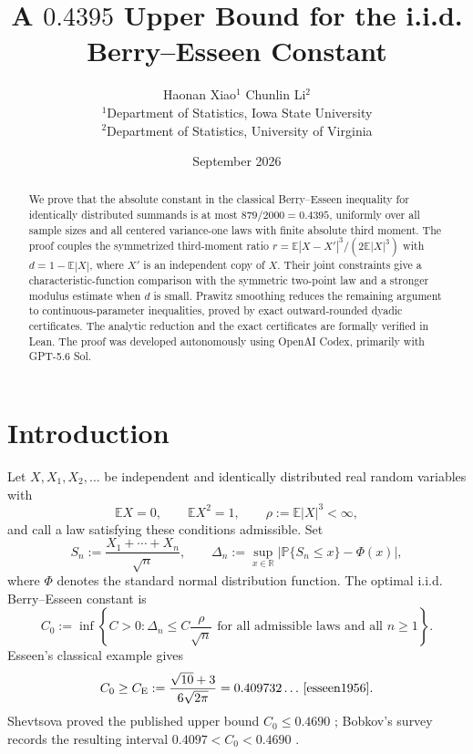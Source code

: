 \documentclass[11pt]{article}
\title{A \(0.4395\) Upper Bound for the i.i.d. Berry--Esseen Constant}
\author{%
  Haonan Xiao\({}^{1}\) \qquad Chunlin Li\({}^{2}\)\\[3pt]
  {\small \({}^{1}\)Department of Statistics, Iowa State University}\\[-1pt]
  {\small \({}^{2}\)Department of Statistics, University of Virginia}
}
\date{September 2026}
\newcommand{\E}{\mathbb E}
\newcommand{\Pp}{\mathbb P}
\newcommand{\R}{\mathbb R}
\newcommand{\abs}[1]{\lvert#1\rvert}
\begin{document}
\maketitle

\begingroup
\renewcommand{\thefootnote}{}
\endgroup

\begin{abstract}
We prove that the absolute constant in the classical Berry--Esseen inequality
for identically distributed summands is at most \(879/2000=0.4395\), uniformly
over all sample sizes and all centered variance-one laws with finite absolute
third moment. The proof couples the symmetrized third-moment ratio
\(r=\E|X-X'|^3/(2\E|X|^3)\) with \(d=1-\E|X|\), where \(X'\) is an
independent copy of \(X\). Their joint constraints give a characteristic-function
comparison with the symmetric two-point law and a stronger modulus estimate
when \(d\) is small. Prawitz smoothing reduces the remaining argument to
continuous-parameter inequalities, proved by exact outward-rounded dyadic
certificates. The analytic reduction and the exact certificates are formally
verified in Lean. The proof was developed autonomously using OpenAI Codex,
primarily with GPT-5.6 Sol.
\end{abstract}
\section{Introduction}\label{sec:introduction}

Let \(X,X_1,X_2,\ldots\) be independent and identically distributed real
random variables with
\[
  \E X=0,\qquad \E X^2=1,\qquad
  \rho:=\E\abs{X}^3<\infty,
\]
and call a law satisfying these conditions admissible.  Set
\[
  S_n:=\frac{X_1+\cdots+X_n}{\sqrt n},\qquad
  \Delta_n:=\sup_{x\in\R}\abs{\Pp\{S_n\le x\}-\Phi(x)},
\]
where \(\Phi\) denotes the standard normal distribution function.  The
optimal i.i.d. Berry--Esseen constant is
\[
 C_0:=\inf\left\{C>0:\Delta_n\le
 C\frac{\rho}{\sqrt n}\text{ for all admissible laws and all }n\ge1\right\}.
\]
Esseen's classical example gives
\[
 C_0\ge C_{\mathrm E}:=
 \frac{\sqrt{10}+3}{6\sqrt{2\pi}}
 =0.409732\ldots\,\cite{esseen1956}.
\]
Shevtsova proved the published upper bound \(C_0\le0.4690\)
\cite{shevtsova2013}; Bobkov's survey records the resulting interval
\(0.4097<C_0<0.4690\) \cite[Theorem~20.1]{bobkov2016}.
\end{document}
